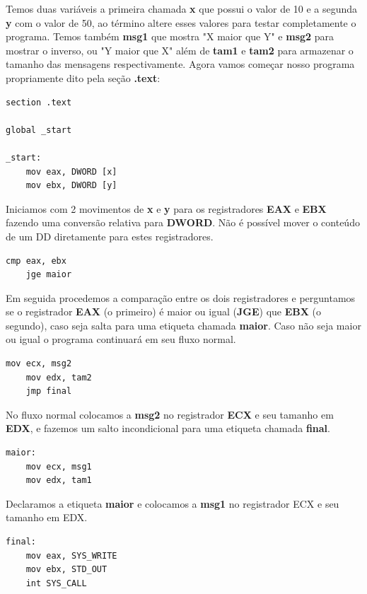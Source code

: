 Temos duas variáveis a primeira chamada \textbf{x} que possui o valor de 10 e a segunda \textbf{y} com o valor de 50, ao término altere esses valores para testar completamente o programa. Temos também \textbf{msg1} que mostra "X maior que Y" e \textbf{msg2} para mostrar o inverso, ou "Y maior que X" além de \textbf{tam1} e \textbf{tam2} para armazenar o tamanho das mensagens respectivamente. Agora vamos começar nosso programa propriamente dito pela seção \textbf{.text}:

\begin{lstlisting}[]
section .text

global _start

_start:
	mov eax, DWORD [x]
	mov ebx, DWORD [y]
\end{lstlisting}

Iniciamos com 2 movimentos de \textbf{x} e \textbf{y} para os registradores \textbf{EAX} e \textbf{EBX} fazendo uma conversão relativa para \textbf{DWORD}. Não é possível mover o conteúdo de um DD diretamente para estes registradores.

\begin{lstlisting}[]
	cmp eax, ebx
	jge maior
\end{lstlisting}

Em seguida procedemos a comparação entre os dois registradores e perguntamos se o registrador \textbf{EAX} (o primeiro) é maior ou igual (\textbf{JGE}) que \textbf{EBX} (o segundo), caso seja salta para uma etiqueta chamada \textbf{maior}. Caso não seja maior ou igual o programa continuará em seu fluxo normal.

\begin{lstlisting}[]
	mov ecx, msg2
	mov edx, tam2
	jmp final
\end{lstlisting}

No fluxo normal colocamos a \textbf{msg2} no registrador \textbf{ECX} e seu tamanho em \textbf{EDX}, e fazemos um salto incondicional para uma etiqueta chamada \textbf{final}.

\begin{lstlisting}[]
maior:
	mov ecx, msg1
	mov edx, tam1
\end{lstlisting}

Declaramos a etiqueta \textbf{maior} e colocamos a \textbf{msg1} no registrador ECX e seu tamanho em EDX.

\begin{lstlisting}[]
final:
	mov eax, SYS_WRITE
	mov ebx, STD_OUT
	int SYS_CALL
\end{lstlisting}


